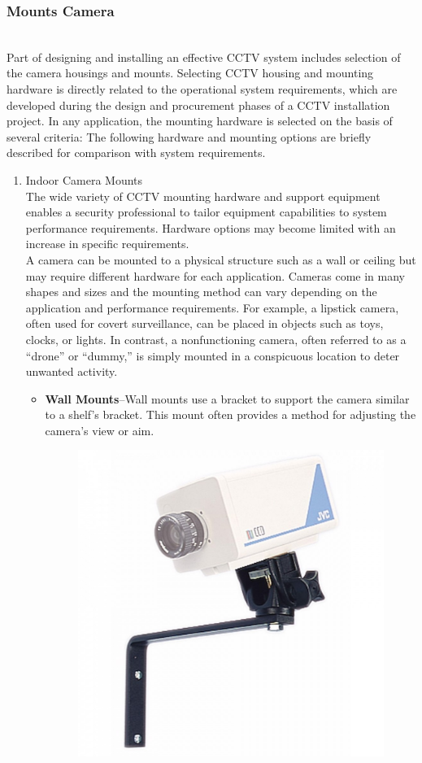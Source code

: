 \documentclass[12pt,fleqn]{book} %
\begin{document}
\subsubsection{Mounts Camera}
\\Part of designing and installing an effective CCTV system includes selection of the camera housings and mounts. Selecting CCTV housing and mounting hardware is directly related to the operational system requirements, which are developed during the design and procurement phases of a CCTV installation project. In any application, the mounting hardware is selected on the basis of several criteria: 
The following hardware and mounting options are briefly described for comparison with system requirements. 
\begin{enumerate}
    \item Indoor Camera Mounts
    \\The wide variety of CCTV mounting hardware and support equipment enables a security professional to tailor equipment capabilities to system performance requirements. Hardware options may become limited with an increase in specific requirements.  
    \\A camera can be mounted to a physical structure such as a wall or ceiling but may require different hardware for each application. Cameras come in many shapes and sizes and the mounting method can vary depending on the application and performance requirements. For example, a lipstick camera, often used for covert surveillance, can be placed in objects such as toys, clocks, or lights. In contrast, a nonfunctioning camera, often referred to as a “drone” or “dummy,” is simply mounted in a conspicuous location to deter unwanted activity.
    \begin{itemize}
        \item \textbf{Wall Mounts}–Wall mounts use a bracket to support the camera similar to a shelf’s bracket. This mount often provides a method for adjusting the camera’s view or aim.
        \begin{figure}[!h]
    \centering
    \includegraphics[width=0.5\linewidth]{c 7.jpg}

\end{figure}
\end{itemize}
\end{enumerate}
\end{document}
